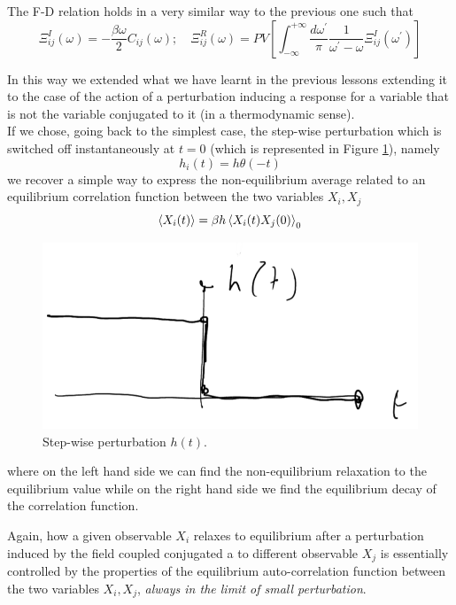 \documentclass[\main/main.tex]{subfiles}
\begin{document}
The F-D relation holds in a very similar way to the previous one such that 
\begin{equation}
    \Xi_{i j}^{I}(\omega)=-\frac{\beta \omega}{2} C_{i j}(\omega); \quad \Xi_{i j}^{R}(\omega)={PV} \left[\int_{-\infty}^{+\infty} \frac{d \omega^{\prime}}{\pi} \frac{1}{\omega^{\prime}-\omega} \Xi_{i j}^{I}\left(\omega^{\prime}\right)\right]
\end{equation}

In this way we extended what we have learnt in the previous lessons extending it to the case of the action of a perturbation inducing a response for a variable that is not the variable conjugated to it (in a thermodynamic sense). \\

If we chose, going back to the simplest case, the step-wise perturbation which is switched off instantaneously at $t=0$ (which is represented in Figure \ref{fig:h}), namely
\begin{equation}
    h_i(t)=h\theta(-t)
\end{equation}
we recover a simple way to express the non-equilibrium average related to an equilibrium correlation function between the two variables $X_i,X_j$
\begin{equation}
    \left\langle X_i(t) \right\rangle=\beta h\left\langle X_i(t)X_j(0) \right\rangle_0 
    \label{eq:onsager}
\end{equation}

\begin{figure}[ht]
    \centering
    \includegraphics[width=0.5\linewidth]{Lectures/Images/h.png}
    \caption{Step-wise perturbation $h(t)$.}
    \label{fig:h}
\end{figure}

where on the left hand side we can find the non-equilibrium relaxation to the equilibrium value while on the right hand side we find the equilibrium decay of the correlation function. 

Again, how a given observable $X_i$ relaxes to equilibrium after a perturbation induced by the field coupled conjugated a to different observable $X_j$ is essentially controlled by the properties of the equilibrium auto-correlation function between the two variables $X_i, X_j$, \textit{always in the limit of small perturbation}. \\
\end{document}
